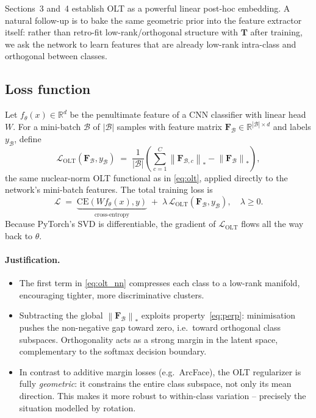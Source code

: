 \documentclass[10pt]{article}
\newcommand{\T}{\mathbf{T}}
\newcommand{\F}{\mathbf{F}}
\newcommand{\nuc}[1]{\left\|#1\right\|_{\ast}}
\begin{document}
Sections~3 and~4 establish OLT as a powerful linear post-hoc
embedding. A natural follow-up is to bake the same geometric prior
into the feature extractor itself: rather than retro-fit
low-rank/orthogonal structure with $\T$ after training, we ask the
network to learn features that are already low-rank intra-class and
orthogonal between classes.

\subsection{Loss function}

Let $f_\theta(x)\in\mathbb{R}^d$ be the penultimate feature of a CNN
classifier with linear head $W$. For a mini-batch $\mathcal{B}$ of
$|\mathcal{B}|$ samples with feature matrix $\F_{\mathcal{B}}\in
\mathbb{R}^{|\mathcal{B}|\times d}$ and labels $y_{\mathcal{B}}$, define
\begin{equation}
\mathcal{L}_{\text{OLT}}(\F_{\mathcal{B}},y_{\mathcal{B}})
\;=\;\frac{1}{|\mathcal{B}|}\!\left(\sum_{c=1}^{C}\nuc{\F_{\mathcal{B},c}}-\nuc{\F_{\mathcal{B}}}\right),
\label{eq:olt_nn}
\end{equation}
the same nuclear-norm OLT functional as in \eqref{eq:olt}, applied
directly to the network's mini-batch features. The total training loss
is
\begin{equation}
\mathcal{L}\;=\;\underbrace{\mathrm{CE}(W f_\theta(x),y)}_{\text{cross-entropy}}
\;+\;\lambda\,\mathcal{L}_{\text{OLT}}(\F_{\mathcal{B}},y_{\mathcal{B}}),
\quad\lambda\ge 0.
\end{equation}
Because PyTorch's SVD is differentiable, the
gradient of $\mathcal{L}_{\text{OLT}}$ flows all the way back to
$\theta$.

\paragraph{Justification.}
\begin{itemize}
\item The first term in \eqref{eq:olt_nn} compresses each class to a
low-rank manifold, encouraging tighter, more discriminative
clusters.
\item Subtracting the global $\nuc{\F_{\mathcal{B}}}$ exploits
property~\eqref{eq:perp}: minimisation pushes the non-negative gap
toward zero, i.e.\ toward orthogonal class subspaces. Orthogonality
acts as a strong margin in the latent space, complementary to the
softmax decision boundary.
\item In contrast to additive margin losses (e.g.\ ArcFace), the OLT
regularizer is fully \emph{geometric}: it constrains the entire
class subspace, not only its mean direction. This makes it more
robust to within-class variation -- precisely the situation
modelled by rotation.
\end{itemize}
\end{document}
